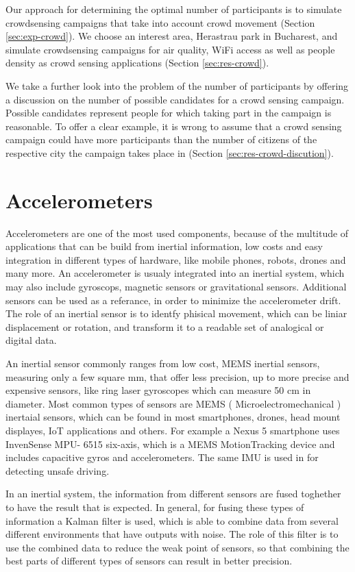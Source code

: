 Our approach for determining the optimal number of participants is to simulate crowdsensing campaigns that take into account crowd movement (Section \ref{sec:exp-crowd}). We choose an interest area, Herastrau park in Bucharest, and simulate crowdsensing campaigns for air quality, WiFi access as well as people density as crowd sensing applications (Section \ref{sec:res-crowd}).

We take a further look into the problem of the number of participants by offering a discussion on the number of possible candidates for a crowd sensing campaign. Possible candidates represent people for which taking part in the campaign is reasonable. To offer a clear example, it is wrong to assume that a crowd sensing campaign could have more participants than the number of citizens of the respective city the campaign takes place in (Section \ref{sec:res-crowd-discution}).


\section{Accelerometers}
\label{sec:intro-acc}
Accelerometers are one of the most used components,
because of the multitude of applications that can be build from
inertial information, low costs and easy integration in different
types of hardware, like mobile phones, robots, drones and
many more. An accelerometer is usualy integrated into an inertial system, which may also include gyroscops, magnetic sensors or gravitational sensors. 
Additional sensors
can be used as a referance, in order to minimize the accelerometer drift. 
The role of an inertial sensor is to identfy phisical
movement, which can be liniar displacement or rotation, and
transform it to a readable set of analogical or digital data.

An inertial sensor commonly ranges from low cost, MEMS inertial
sensors, measuring only a few square mm, that offer less
precision, up to more precise and expensive sensors, like ring
laser gyroscopes which can measure 50 cm in diameter. Most
common types of sensors are MEMS ( Microelectromechanical ) inertaial sensors, which can be found in most smartphones,
drones, head mount displayes, IoT applications and others.
For example a Nexus 5 smartphone uses InvenSense MPU-
6515 six-axis, which is a MEMS MotionTracking device and
includes capacitive gyros and accelerometers. The same IMU
is used in \cite{Liu-2015} for detecting unsafe driving. 

In an inertial system, the information from different sensors
are fused toghether to have the result that is expected. In
general, for fusing these types of information a Kalman filter
is used, which is able to combine data from several different
environments that have outputs with noise. The role of this
filter is to use the combined data to reduce the weak point of
sensors, so that combining the best parts of different types of
sensors can result in better precision.
